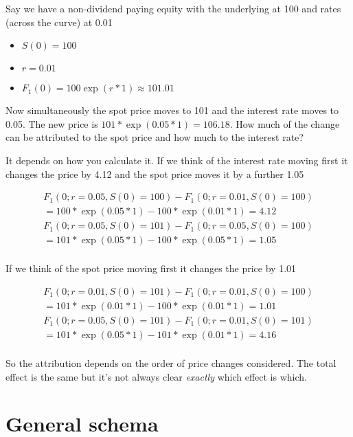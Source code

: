 \documentclass{tran-l}
\theoremstyle{definition}
\theoremstyle{remark}
\numberwithin{equation}{subsection}
\begin{document}
Say we have a non-dividend paying equity with the underlying at 100 and rates (across the curve) at 0.01

\begin{itemize}
\item $S(0) = 100$
\item $r = 0.01$
\item $F_1(0) = 100\exp(r*1) \approx 101.01$
\end{itemize}

Now simultaneously the spot price moves to 101 and the interest rate moves to 0.05.  The new price is $101*\exp(0.05*1) = 106.18$. How much of the change can be attributed to the spot price and how much to the interest rate?

It depends on how you calculate it. If we think of the interest rate moving first it changes the price by 4.12 and the spot price moves it by a further 1.05


\begin{eqnarray*}
F_1(0; r=0.05,S(0)=100)  - F_1(0; r=0.01,S(0)=100)  \\
= 100*\exp(0.05*1)  - 100*\exp(0.01*1)  = 4.12\\
F_1(0; r=0.05,S(0)=101)  - F_1(0; r=0.05,S(0)=100)  \\
= 101*\exp(0.05*1)  - 100*\exp(0.05*1)  = 1.05\\
\end{eqnarray*}

If we think of the spot price moving first it changes the price by 1.01

\begin{eqnarray*}
F_1(0; r=0.01,S(0)=101)  - F_1(0; r=0.01,S(0)=100) \\ 
= 101*\exp(0.01*1)  - 100*\exp(0.01*1)  = 1.01\\
F_1(0; r=0.05,S(0)=101)  - F_1(0; r=0.01,S(0)=101)\\
  = 101*\exp(0.05*1) - 101*\exp(0.01*1)  = 4.16\\
\end{eqnarray*}

So the attribution depends on the order of price changes considered.  The total effect is the same but it's not always clear \textit{exactly} which effect is which. 

\section{General schema}
\end{document}
